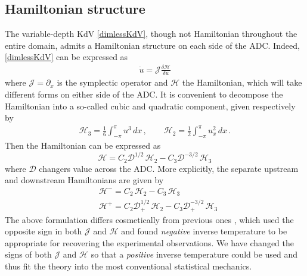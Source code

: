 \documentclass[11pt]{article}
\newcommand{\pdi}[2] { {\partial_#2} #1 }
\newcommand{\dx}{\, dx}
\newcommand{\drat}{\mathcal{D}}
\newcommand{\dratdn}{\drat_+}
\newcommand{\sympJ}{\mathcal{J}}
\newcommand{\vard}[2]{\frac{\delta #1}{\delta #2}}
\newcommand{\Ham}{\mathcal{H}}
\newcommand{\Hthree}{\Ham_{3}}
\newcommand{\Htwo}{\Ham_{2}}
\newcommand{\Hup}{\Ham^{-}}
\newcommand{\Hdn}{\Ham^{+}}
\begin{document}
 

\subsection{Hamiltonian structure}

The variable-depth KdV \eqref{dimlessKdV}, though not Hamiltonian throughout the entire domain, admits a Hamiltonian structure on each side of the ADC. Indeed, \eqref{dimlessKdV} can be expressed as
\begin{align}
\dot{u} = \sympJ \vard{\Ham}{u}
\end{align}
where $\sympJ = \pdi{}{x}$ is the symplectic operator and $\Ham$ the Hamiltonian, which will take different forms on either side of the ADC. It is convenient to decompose the Hamiltonian into a so-called cubic and quadratic component, given respectively by
\begin{align}
\Hthree = \frac{1}{6} \int_{-\pi}^{\pi} u^3 \dx	\, , \qquad
\Htwo = \frac{1}{2} \int_{-\pi}^{\pi} u_x^2 \dx	\, .
\end{align}
Then the Hamiltonian can be expressed as
\begin{equation}
\Ham = C_2 \drat^{1/2} \, \Htwo - C_3 \drat^{-3/2} \, \Hthree
\end{equation}
where $\drat$ changers value across the ADC. More explicitly, the separate upstream and downstream Hamiltonians are given by
\begin{align}
&\Hup = C_2 \, \Htwo - C_3 \, \Hthree  \\
&\Hdn = C_2 \dratdn^{1/2} \, \Htwo - C_3 \dratdn^{-3/2} \, \Hthree
\end{align}
The above formulation differs cosmetically from previous ones \cite{abramov2003hamiltonian, majda2019statistical}, which used the opposite sign in both $\sympJ$ and $\Ham$ and found  {\em negative} inverse temperature to be appropriate for recovering the experimental observations. We have changed the signs of both $\sympJ$ and $\Ham$ so that a {\em positive} inverse temperature could be used and thus fit the theory into the most conventional statistical mechanics.
\end{document}
